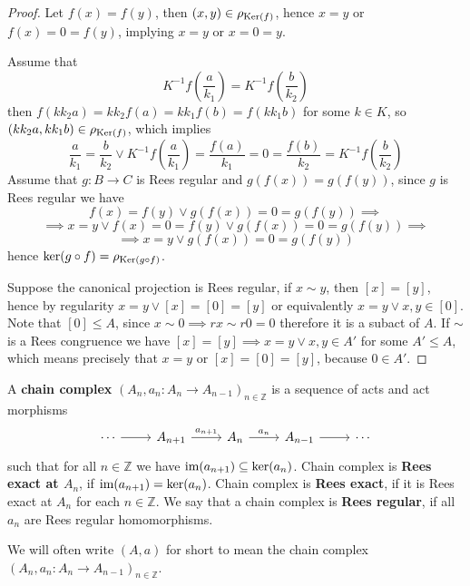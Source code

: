 \begin{proof}[Proof]
    Let $f(x)=f(y)$, then $(x,y)\in\rho_{\mathrm{Ker}(f)}$, hence $x=y$ or $f(x)=0=f(y)$, implying $x=y$ or $x=0=y$.\par 
    Assume that 
    \[
        K^{-1}f\left(\frac{a}{k_1}\right) = K^{-1}f\left(\frac{b}{k_2}\right)
    \]
    then $f(kk_2a)=kk_2f(a) = kk_1f(b)=f(kk_1b)$ for some $k\in K$, so $(kk_2 a,kk_1b)\in\rho_{\mathrm{Ker}(f)}$, which implies 
    \[
        \frac{a}{k_1}=\frac{b}{k_2} \lor K^{-1}f\left(\frac{a}{k_1}\right)= \frac{f(a)}{k_1} = 0 = \frac{f(b)}{k_2} = K^{-1}f\left(\frac{b}{k_2}\right) 
    \]
    Assume that $g: B\to C$ is Rees regular and $g(f(x))=g(f(y))$, since $g$ is Rees regular we have 
    \[
        f(x)=f(y) \lor g(f(x))=0=g(f(y)) \implies 
        \]
        \[\implies x=y \lor f(x)=0=f(y) \lor g(f(x))=0=g(f(y)) \implies
    \]
    \[
        \implies x=y \lor g(f(x))=0=g(f(y))
    \]
    hence $\mathrm{ker}(g\circ f) = \rho_{\mathrm{Ker}(g\circ f)}$.\par
    Suppose the canonical projection is Rees regular, if $x\sim y$, then $[x]=[y]$, hence by regularity 
    $x=y \lor [x]=[0]=[y]$ or equivalently $x=y\lor x,y\in [0]$. Note that $[0]\leq A$, since $x\sim 0 \implies rx\sim r0 = 0$ 
    therefore it is a subact of $A$. If $\sim$ is a Rees congruence we have $[x]=[y] \implies x=y \lor x,y\in A'$ for some $A'\leq A$,
    which means precisely that $x=y$ or $[x]=[0]=[y]$, because $0\in A'$. 
\end{proof}
\begin{definition}
    A \textbf{chain complex} $(A_n,a_{n} : A_n\to A_{n-1})_{n\in\mathbb{Z}}$ is a sequence of acts and act morphisms
    \[\begin{tikzcd}
        \cdots & {A_{n+1}} & {A_n} & {A_{n-1}} & \cdots
        \arrow[from=1-1, to=1-2]
        \arrow["{a_{n+1}}", from=1-2, to=1-3]
        \arrow["{a_n}", from=1-3, to=1-4]
        \arrow[from=1-4, to=1-5]
    \end{tikzcd}\]
    such that for all $n\in\mathbb{Z}$ we have $\text{im}(a_{n+1})\subseteq\mathrm{ker}(a_n)$. Chain complex is \textbf{Rees exact
    at $A_n$}, if $\text{im}(a_{n+1})=\mathrm{ker}(a_n)$. Chain complex is \textbf{Rees exact}, if it is Rees exact at $A_n$ for each $n\in\mathbb{Z}$. 
    We say that a chain complex is \textbf{Rees regular}, if all $a_n$ are Rees regular homomorphisms.
\end{definition}
We will often write $(A,a)$ for short to mean the chain complex $(A_n,a_{n} : A_n\to A_{n-1})_{n\in\mathbb{Z}}$. \par
